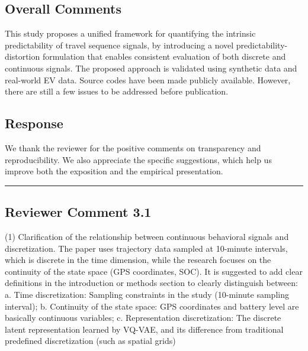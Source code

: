 \documentclass{NSF}
\begin{document}
\subsection*{Overall Comments}
\begin{mdframed}
This study proposes a unified framework for quantifying the intrinsic predictability of travel sequence signals, by introducing a novel predictability-distortion formulation that enables consistent evaluation of both discrete and continuous signals. The proposed approach is validated using synthetic data and real-world EV data. Source codes have been made publicly available. However, there are still a few issues to be addressed before publication.
\end{mdframed}
\subsection{Response}
We thank the reviewer for the positive comments on transparency and reproducibility. We also appreciate the specific suggestions, which help us improve both the exposition and the empirical presentation.

\noindent\rule{16.5cm}{1.0pt}

\subsection{Reviewer Comment 3.1}
\begin{mdframed}
(1) Clarification of the relationship between continuous behavioral signals and discretization. The paper uses trajectory data sampled at 10-minute intervals, which is discrete in the time dimension, while the research focuses on the continuity of the state space (GPS coordinates, SOC). It is suggested to add clear definitions in the introduction or methods section to clearly distinguish between: a. Time discretization: Sampling constraints in the study (10-minute sampling interval); b. Continuity of the state space: GPS coordinates and battery level are basically continuous variables; c. Representation discretization: The discrete latent representation learned by VQ-VAE, and its difference from traditional predefined discretization (such as spatial grids)
\end{mdframed}
\end{document}
